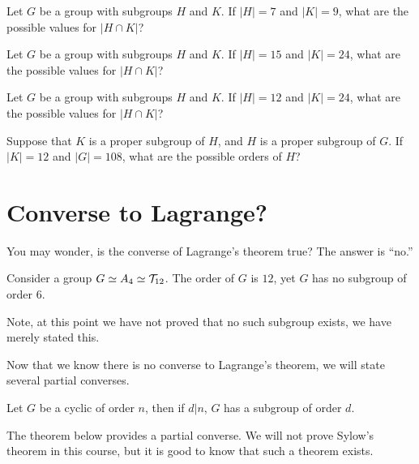 \documentclass{ximera}
\begin{document}
\begin{exercise}
  Let $G$ be a group with subgroups $H$ and $K$. If $|H|=7$ and $|K| =
  9$, what are the possible values for $|H\cap K|$?
\end{exercise}


\begin{exercise}
  Let $G$ be a group with subgroups $H$ and $K$. If $|H|=15$ and $|K|
  = 24$, what are the possible values for $|H\cap K|$?
\end{exercise}


\begin{exercise}
  Let $G$ be a group with subgroups $H$ and $K$. If $|H|=12$ and $|K|
  = 24$, what are the possible values for $|H\cap K|$?
\end{exercise}

\begin{exercise}
  Suppose that $K$ is a proper subgroup of $H$, and $H$ is a proper
  subgroup of $G$. If $|K| =12$ and $|G| = 108$, what are the possible
  orders of $H$?
\end{exercise}


\section{Converse to Lagrange?}

You may wonder, is the converse of Lagrange's theorem true? The answer
is ``no.''

\begin{example}
  Consider a group $G\simeq A_4\simeq \mathcal{T}_{12}$. The order of $G$
  is $12$, yet $G$ has no subgroup of order $6$.

  Note, at this point we have not proved that no such subgroup exists,
  we have merely stated this.
\end{example}

Now that we know there is no converse to Lagrange's theorem, we will
state several partial converses.


\begin{exercise}
  Let $G$ be a cyclic of order $n$, then if $d|n$, $G$ has a subgroup
  of order $d$.
\end{exercise}




The theorem below provides a partial converse. We will not prove
Sylow's theorem in this course, but it is good to know that such a
theorem exists.
\end{document}
